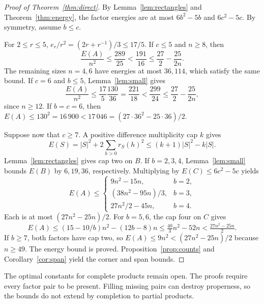 \documentclass[11pt,a4paper]{article}
\theoremstyle{definition}
\numberwithin{equation}{section}
\begin{document}
\begin{proof}[Proof of Theorem~\ref{thm:direct}]
By Lemma~\ref{lem:rectangles} and Theorem~\ref{thm:energy}, the factor energies are at most $6b^2-5b$ and $6c^2-5c$. By symmetry, assume $b\le c$.

For $2\le r\le5$, $e_r/r^2=(2r+r^{-1})/3\le17/5$. If $c\le5$ and $n\ge8$, then
\[
\frac{E(A)}{n^2}\le\frac{289}{25}<\frac{191}{16}
\le\frac{27}{2}-\frac{25}{2n}.
\]
The remaining sizes $n=4,6$ have energies at most $36,114$, which satisfy the same bound. If $c=6$ and $b\le5$, Lemma~\ref{lem:small} gives
\[
\frac{E(A)}{n^2}\le\frac{17}{5}\frac{130}{36}
=\frac{221}{18}<\frac{299}{24}
\le\frac{27}{2}-\frac{25}{2n},
\]
since $n\ge12$. If $b=c=6$, then $E(A)\le130^2=16\,900<17\,046=(27\cdot36^2-25\cdot36)/2$.

Suppose now that $c\ge7$. A positive difference multiplicity cap $k$ gives
\begin{equation}\label{eq:multiplicity-energy}
E(S)=|S|^2+2\sum_{h>0}r_S(h)^2
\le(k+1)|S|^2-k|S|.
\end{equation}
Lemma~\ref{lem:rectangles} gives cap two on $B$. If $b=2,3,4$, Lemma~\ref{lem:small} bounds $E(B)$ by $6,19,36$, respectively. Multiplying by $E(C)\le6c^2-5c$ yields
\[
E(A)\le
\begin{cases}
9n^2-15n,&b=2,\\
(38n^2-95n)/3,&b=3,\\
27n^2/2-45n,&b=4.
\end{cases}
\]
Each is at most $(27n^2-25n)/2$. For $b=5,6$, the cap four on $C$ gives
\[
E(A)\le(15-10/b)n^2-(12b-8)n
\le\tfrac{40}{3}n^2-52n<\tfrac{27n^2-25n}{2}.
\]
If $b\ge7$, both factors have cap two, so $E(A)\le9n^2<(27n^2-25n)/2$ because $n\ge49$. The energy bound is proved. Proposition~\ref{prop:counts} and Corollary~\ref{cor:span} yield the corner and span bounds.
\end{proof}
The optimal constants for complete products remain open. The proofs require every factor pair to be present. Filling missing pairs can destroy properness, so the bounds do not extend by completion to partial products.
\end{document}
